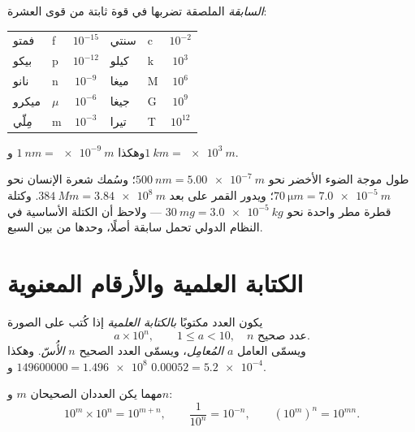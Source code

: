 \begin{definition}\label{def:g10:orders-of-magnitude:prefixes}
\emph{السابقة} الملصقة  تضربها في
قوة ثابتة من قوى العشرة:
\begin{center}
\begin{tabular}{llc@{\qquad\qquad}llc}
فمتو & f & $10^{-15}$ & سنتي & c & $10^{-2}$ \\
بيكو  & p & $10^{-12}$ & كيلو  & k & $10^{3}$  \\
نانو  & n & $10^{-9}$  & ميغا  & M & $10^{6}$  \\
ميكرو & $\mu$ & $10^{-6}$ & جيغا & G & $10^{9}$ \\
مِلّي & m & $10^{-3}$  & تيرا  & T & $10^{12}$ \\
\end{tabular}
\end{center}
وهكذا $\qty{1}{nm} = \qty{e-9}{m}$ و$\qty{1}{km} = \qty{e3}{m}$.
\end{definition}

\begin{example}\label{ex:g10:orders-of-magnitude:prefixes}
طول موجة الضوء الأخضر نحو $\qty{500}{nm} = \qty{5.00e-7}{m}$؛
وسُمك شعرة الإنسان نحو $\qty{70}{\micro m} = \qty{7.0e-5}{m}$؛
ويدور القمر على بعد $\qty{384}{Mm} = \qty{3.84e8}{m}$. وكتلة قطرة مطر
واحدة نحو $\qty{30}{mg} = \qty{3.0e-5}{kg}$ --- ولاحظ أن  الكتلة
الأساسية في النظام الدولي تحمل سابقة أصلًا، وحدها من بين السبع.
\end{example}

\section{الكتابة العلمية والأرقام المعنوية}

\begin{definition}\label{def:g10:orders-of-magnitude:scinot}
يكون العدد مكتوبًا \emph{بالكتابة العلمية}
إذا كُتب على الصورة
\[
a \times 10^{n}, \qquad 1 \leq a < 10, \quad n \text{ عدد صحيح.}
\]
ويسمّى العامل $a$ \emph{المُعامِل}، ويسمّى العدد الصحيح
$n$ \emph{الأُسّ}.
وهكذا $\num{149600000} = \num{1.496e8}$ و
$\num{0.00052} = \num{5.2e-4}$.
\end{definition}

\begin{proposition}\label{prop:g10:orders-of-magnitude:powers}
مهما يكن العددان الصحيحان $m$ و$n$:
\[
10^{m} \times 10^{n} = 10^{m+n}, \qquad
\frac{1}{10^{n}} = 10^{-n}, \qquad
\left(10^{m}\right)^{n} = 10^{mn}.
\]
\end{proposition}

